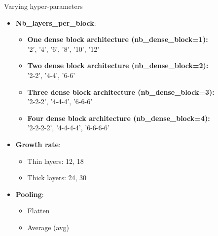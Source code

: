 \begin{flushleft}{Varying hyper-parameters}
 \begin{itemize}
  \item \textbf{Nb\_layers\_per\_block}:
  \begin{itemize}
   \item \textbf{One dense block architecture (nb\_dense\_block=1):}\\
   '2', '4', '6', '8', '10', '12'
   \item \textbf{Two dense block architecture (nb\_dense\_block=2):}\\
   '2-2', '4-4', '6-6'
   \item \textbf{Three dense block architecture (nb\_dense\_block=3):}\\
   '2-2-2', '4-4-4', '6-6-6'
   \item \textbf{Four dense block architecture (nb\_dense\_block=4):}\\
   '2-2-2-2', '4-4-4-4', '6-6-6-6'
  \end{itemize}
 \item \textbf{Growth rate}:
  \begin{itemize}
  \item Thin layers: 12, 18    
  \item Thick layers: 24, 30    
 \end{itemize}
 \item \textbf{Pooling}:
 \begin{itemize}
  \item Flatten
  \item Average (avg)
 \end{itemize}  
 
\end{itemize}
 
\end{flushleft}

\flushbottom
\newpage

